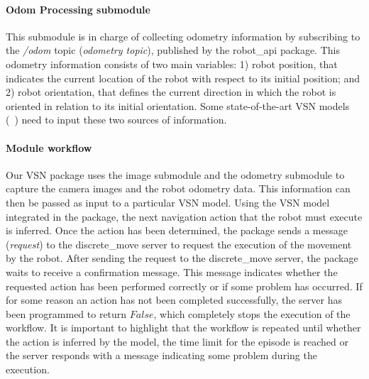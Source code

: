 \paragraph{Odom Processing submodule}\label{par:odom-processing}

This submodule is in charge of collecting odometry information by subscribing to the \textit{/odom} topic (\textit{odometry topic}), published by the robot\_api package.
This odometry information consists of two main variables: 1) robot position, that indicates the current location of the robot with respect to its initial position; and 2) robot orientation, that defines the current direction in which the robot is oriented in relation to its initial orientation.
Some state-of-the-art VSN models (\eg~\cite{ramrakhya2023}) need to input these two sources of information.

\paragraph{\textbf{Module workflow}}\label{par:module-workflow}

Our VSN package uses the image submodule and the odometry submodule to capture the camera images and the robot odometry data.
This information can then be passed as input to a particular VSN model.
Using the VSN model integrated in the package, the next navigation action that the robot must execute is inferred.
Once the action has been determined, the package sends a message (\textit{request}) to the discrete\_move server to request the execution of the movement by the robot.
After sending the request to the discrete\_move server, the package waits to receive a confirmation message.
This message indicates whether the requested action has been performed correctly or if some problem has occurred.
If for some reason an action has not been completed successfully, the server has been programmed to return $False$, which completely stops the execution of the workflow.
It is important to highlight that the workflow is repeated until whether the \stopac action is inferred by the model, the time limit for the episode is reached or the server responds with a message indicating some problem during the execution.

